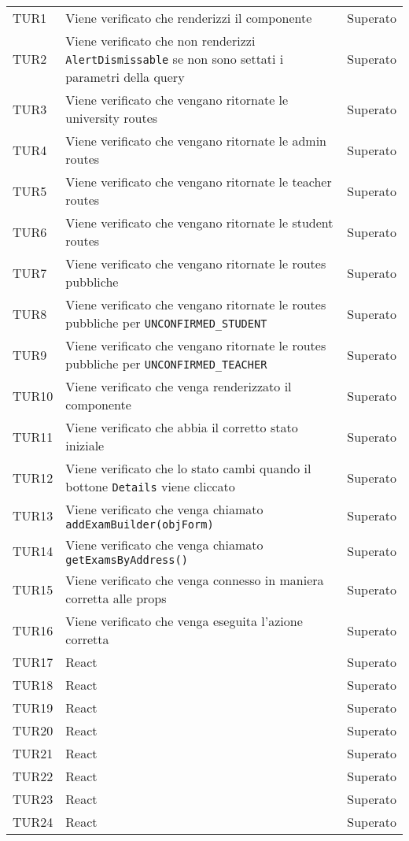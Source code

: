 \documentclass[PianoDiQualifica.tex]{subfiles}
\begin{document}
\begin{longtable}[H]{P{2cm}P{8.5cm}P{3cm}}
	\hhline{===}
	TUR1 & Viene verificato che renderizzi il componente & Superato \\ 
	TUR2 & Viene verificato che non renderizzi \texttt{AlertDismissable} se non sono settati i parametri della query & Superato \\ 
	TUR3 & Viene verificato che vengano ritornate le university routes  & Superato \\ 
	TUR4 & Viene verificato che vengano ritornate le admin routes  & Superato \\ 
	TUR5 & Viene verificato che vengano ritornate le teacher routes  & Superato \\ 
	TUR6 & Viene verificato che vengano ritornate le student routes  & Superato \\ 
	TUR7 & Viene verificato che vengano ritornate le routes pubbliche & Superato \\ 
	TUR8 & Viene verificato che vengano ritornate le routes pubbliche per \texttt{UNCONFIRMED\_STUDENT} & Superato \\ 
	TUR9 & Viene verificato che vengano ritornate le routes pubbliche per \texttt{UNCONFIRMED\_TEACHER} & Superato \\ 
	TUR10 & Viene verificato che venga renderizzato il componente & Superato \\ 
	TUR11 & Viene verificato che abbia il corretto stato iniziale & Superato \\ 
	TUR12 & Viene verificato che lo stato cambi quando il bottone \texttt{Details} viene cliccato & Superato \\ 
	TUR13 & Viene verificato che venga chiamato \texttt{addExamBuilder(objForm)} & Superato \\ 
	TUR14 & Viene verificato che venga chiamato \texttt{getExamsByAddress()} & Superato \\ 
	TUR15 & Viene verificato che venga connesso in maniera corretta alle props & Superato \\ 
	TUR16 & Viene verificato che venga eseguita l'azione corretta & Superato \\ 
	TUR17 & React & Superato \\ 
	TUR18 & React & Superato \\ 
	TUR19 & React & Superato \\ 
	TUR20 & React & Superato \\ 
	TUR21 & React & Superato \\ 
	TUR22 & React & Superato \\ 
	TUR23 & React & Superato \\ 
	TUR24 & React & Superato \\ 

\end{longtable}
\end{document}
